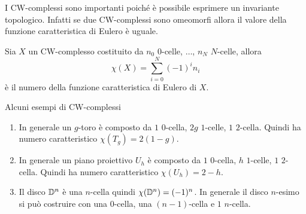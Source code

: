 I CW-complessi sono importanti poiché è possibile esprimere un invariante topologico. Infatti se due CW-complessi sono omeomorfi allora il valore della funzione caratteristica di Eulero è uguale. 

\begin{definition}
	Sia $X$ un CW-complesso costituito da $n_0$ $0$-celle, $\dots$, $n_N$ $N$-celle, allora 
	\begin{equation*}
		\chi(X) = \sum_{i=0}^{N} (-1)^i n_i
	\end{equation*}
	è il numero della funzione caratteristica di Eulero di $X$. 
\end{definition}

\begin{remark}
	Alcuni esempi di CW-complessi
	\begin{enumerate}
		\item In generale un $g$-toro è composto da $1$ $0$-cella, $2g$ $1$-celle, $1$ $2$-cella. Quindi ha numero caratteristico $\chi(T_g) = 2(1-g)$. 
		\item In generale un piano proiettivo $U_h$ è composto da $1$ $0$-cella, $h$ $1$-celle, $1$ $2$-cella. Quindi ha numero caratteristico $\chi(U_h) = 2 - h$.
		\item Il disco $\mathbb{D}^n$ è una $n$-cella quindi $\chi(\mathbb{D}^n) = (-1)^n$. In generale il disco $n$-esimo si può costruire con una $0$-cella, una $(n-1)$-cella e $1$ $n$-cella.
	\end{enumerate}
\end{remark}

